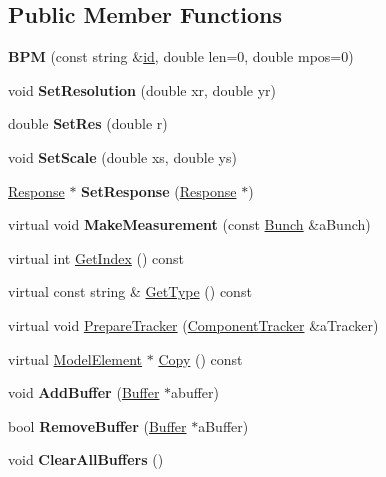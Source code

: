 \subsection*{Public Member Functions}
\begin{DoxyCompactItemize}
\item 
\mbox{\label{classBPM_a5b3c7aea940a5894dfcaca0a3e3ca999}} 
{\bfseries B\+PM} (const string \&\hyperlink{classModelElement_aada171ead2085c75b592cf07d91bc5c2}{id}, double len=0, double mpos=0)
\item 
\mbox{\label{classBPM_a3d13a6666a7ed0764c032ccc6cc326bf}} 
void {\bfseries Set\+Resolution} (double xr, double yr)
\item 
\mbox{\label{classBPM_aa13a91f52e78d6610b16b21639deb390}} 
double {\bfseries Set\+Res} (double r)
\item 
\mbox{\label{classBPM_ab6e698f9655b8b13bed9f7dc7f70cf1e}} 
void {\bfseries Set\+Scale} (double xs, double ys)
\item 
\mbox{\label{classBPM_aa34bd41aa62234b3a956b6dad58d739c}} 
\hyperlink{classBPM_1_1Response}{Response} $\ast$ {\bfseries Set\+Response} (\hyperlink{classBPM_1_1Response}{Response} $\ast$)
\item 
\mbox{\label{classBPM_a5fc14b1e25177f95ef65dba3becc2663}} 
virtual void {\bfseries Make\+Measurement} (const \hyperlink{classBunch}{Bunch} \&a\+Bunch)
\item 
virtual int \hyperlink{classBPM_acaf99f021f92252962f2fbcbc24a2679}{Get\+Index} () const
\item 
virtual const string \& \hyperlink{classBPM_a1fbab5ffd976674ed24ef5833caaf7ee}{Get\+Type} () const
\item 
virtual void \hyperlink{classBPM_a3f0db54eff4f4e95fc2dd81728ea8759}{Prepare\+Tracker} (\hyperlink{classComponentTracker}{Component\+Tracker} \&a\+Tracker)
\item 
virtual \hyperlink{classModelElement}{Model\+Element} $\ast$ \hyperlink{classBPM_a21bba21422046a434a38268c0cb5ada6}{Copy} () const
\item 
\mbox{\label{classBPM_ac1116db96cd45fdc5916c051e55ea454}} 
void {\bfseries Add\+Buffer} (\hyperlink{classBPM_1_1Buffer}{Buffer} $\ast$abuffer)
\item 
\mbox{\label{classBPM_aa34dbcecc2c8febed932371753e903b6}} 
bool {\bfseries Remove\+Buffer} (\hyperlink{classBPM_1_1Buffer}{Buffer} $\ast$a\+Buffer)
\item 
\mbox{\label{classBPM_a1c2f74ef9b72e81da05fc682ae04e03d}} 
void {\bfseries Clear\+All\+Buffers} ()
\end{DoxyCompactItemize}
